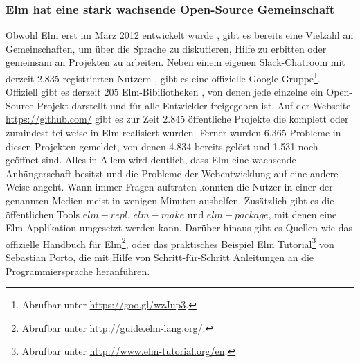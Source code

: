 \subsubsection{Elm hat eine stark wachsende Open-Source Gemeinschaft}
Obwohl Elm erst im März 2012 entwickelt wurde \cite[Vgl.]{evan-thesis}, gibt es bereits eine Vielzahl an Gemeinschaften, um über die Sprache zu diskutieren, Hilfe zu erbitten oder gemeinsam an Projekten zu arbeiten. Neben einem eigenen Slack-Chatroom mit derzeit 2.835 registrierten Nutzern \cite[Vgl.]{slack-user}, gibt es eine offizielle Google-Gruppe\footnote{Abrufbar unter  \url{https://goo.gl/wzJup3}.}. Offiziell gibt es derzeit $205$ Elm-Bibiliotheken \cite[Vgl.]{elm-package}, von denen jede einzelne ein Open-Source-Projekt darstellt und für alle Entwickler freigegeben ist. Auf der Webseite \url{https://github.com/} gibt es zur Zeit 2.845 öffentliche Projekte \cite[Vgl.]{elm-repositories} die komplett oder zumindest teilweise in Elm realisiert wurden. Ferner wurden 6.365 Probleme in diesen Projekten gemeldet, von denen 4.834 bereits gelöst und 1.531 noch geöffnet sind\cite[Vgl.]{elm-github-issues}.  Alles in Allem wird deutlich, dass Elm eine wachsende Anhängerschaft besitzt und die Probleme der Webentwicklung auf eine andere Weise angeht. Wann immer Fragen auftraten konnten die Nutzer in einer der genannten Medien meist in wenigen Minuten aushelfen. Zusätzlich gibt es die öffentlichen Tools $elm-repl$, $elm-make$ und $elm-package$, mit denen eine Elm-Applikation umgesetzt werden kann. Darüber hinaus gibt es Quellen wie das offizielle Handbuch für Elm\footnote{Abrufbar unter \url{http://guide.elm-lang.org/}.}, oder das praktisches Beispiel \glqq Elm Tutorial\grqq\cite[Vgl.]{elm-tutorial}\footnote{Abrufbar unter \url{http://www.elm-tutorial.org/en}.} von Sebastian Porto, die mit Hilfe von Schritt-für-Schritt Anleitungen an die Programmiersprache heranführen.


